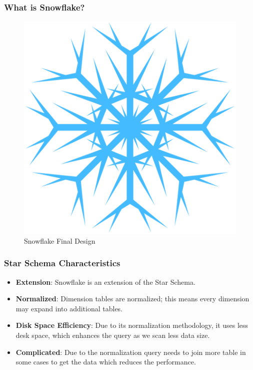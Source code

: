 \begin{frame}
	\frametitle{What is Snowflake?}
	\begin{figure}
		\includegraphics[scale=0.2]{Ch01-Introduction-data-management/12-Data-Model/04-Data-Model-Schema-Types/Figures/Frozen-Snowflake-PNG-File.png}
		\caption{Snowflake Final Design}
	\end{figure}
\end{frame}
\begin{frame}
\frametitle{Star Schema Characteristics}
	\begin{itemize}
		\item \textbf{Extension}: Snowflake is an extension of the Star Schema.
		\item \textbf{Normalized}: Dimension tables are normalized; this means every dimension may expand into additional tables.
		\item \textbf{Disk Space Efficiency}:  Due to its normalization methodology, it uses less desk space, which enhances the query as we scan less data size.
		\item \textbf{Complicated}: Due to the normalization query needs to join more table in some cases to get the data which reduces the performance.
	\end{itemize}

\end{frame}

